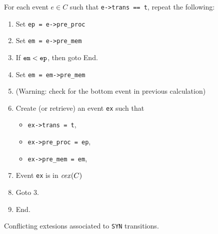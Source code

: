 \documentclass{llncs}
\begin{document}
\begin{algorithm}
\noindent
For each event $e \in C$ such that \verb!e->trans == t!, repeat the following:
\begin{enumerate}
\item Set \verb!ep = e->pre_proc!
\item Set \verb!em = e->pre_mem!
\item If $\verb!em! < \verb!ep!$, then goto End.
\item Set \verb!em = em->pre_mem!
\item (Warning: check for the bottom event in previous calculation)
\item
  Create (or retrieve) an event \verb!ex! such that
  \begin{itemize}
  \item \verb!ex->trans = t!,
  \item \verb!ex->pre_proc = ep!,
  \item \verb!ex->pre_mem = em!,
  \end{itemize}
\item Event \verb!ex! is in $\mathop{\mathit{cex}} (C)$
\item Goto 3.
\item End.
\end{enumerate}
\caption{Conflicting extesions associated to \texttt{SYN} transitions.}
\label{a:cex_syn}
\end{algorithm}
\end{document}
